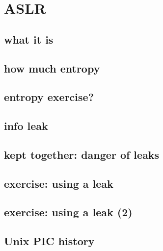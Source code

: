 

\section{ASLR}


\subsection{what it is}


\subsection{how much entropy}


\subsection{entropy exercise?}


\subsection{info leak}


\subsection{kept together: danger of leaks}


\subsection{exercise: using a leak}


\subsection{exercise: using a leak (2)}





\subsection{Unix PIC history}


